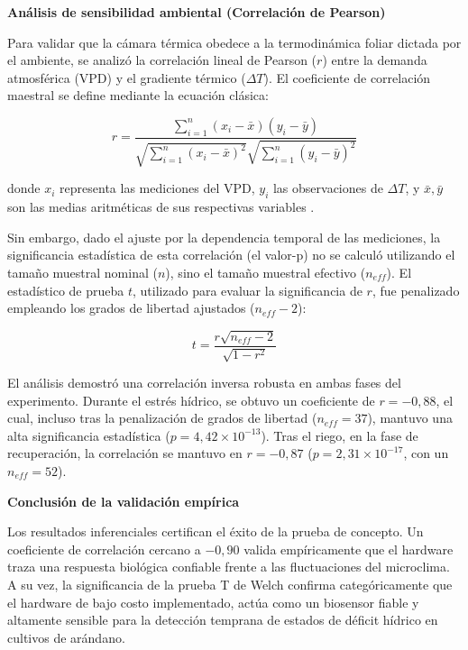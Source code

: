 \textbf{Análisis de sensibilidad ambiental (Correlación de Pearson)}

Para validar que la cámara térmica obedece a la termodinámica foliar dictada por el ambiente, se analizó la correlación lineal de Pearson ($r$) entre la demanda atmosférica (VPD) y el gradiente térmico ($\Delta T$). El coeficiente de correlación maestral se define mediante la ecuación clásica:

$$r = \frac{\sum_{i=1}^{n} (x_i - \bar{x})(y_i - \bar{y})}{\sqrt{\sum_{i=1}^{n} (x_i - \bar{x})^2} \sqrt{\sum_{i=1}^{n} (y_i - \bar{y})^2}}$$

donde $x_i$ representa las mediciones del VPD, $y_i$ las observaciones de $\Delta T$, y $\bar{x}, \bar{y}$ son las medias aritméticas de sus respectivas variables . 

Sin embargo, dado el ajuste por la dependencia temporal de las mediciones, la significancia estadística de esta correlación (el valor-p) no se calculó utilizando el tamaño muestral nominal ($n$), sino el tamaño muestral efectivo ($n_{eff}$). El estadístico de prueba $t$, utilizado para evaluar la significancia de $r$, fue penalizado empleando los grados de libertad ajustados ($n_{eff} - 2$):

$$t = \frac{r \sqrt{n_{eff} - 2}}{\sqrt{1 - r^2}}$$

El análisis demostró una correlación inversa robusta en ambas fases del experimento. Durante el estrés hídrico, se obtuvo un coeficiente de $r = -0,88$, el cual, incluso tras la penalización de grados de libertad ($n_{eff} = 37$), mantuvo una alta significancia estadística ($p = 4,42 \times 10^{-13}$). Tras el riego, en la fase de recuperación, la correlación se mantuvo en $r = -0,87$ ($p = 2,31 \times 10^{-17}$, con un $n_{eff} = 52$).

\textbf{Conclusión de la validación empírica}

Los resultados inferenciales certifican el éxito de la prueba de concepto. Un coeficiente de correlación cercano a $-0,90$ valida empíricamente que el hardware traza una respuesta biológica confiable frente a las fluctuaciones del microclima. A su vez, la significancia de la prueba T de Welch confirma categóricamente que el hardware de bajo costo implementado, actúa como un biosensor fiable y altamente sensible para la detección temprana de estados de déficit hídrico en cultivos de arándano.
